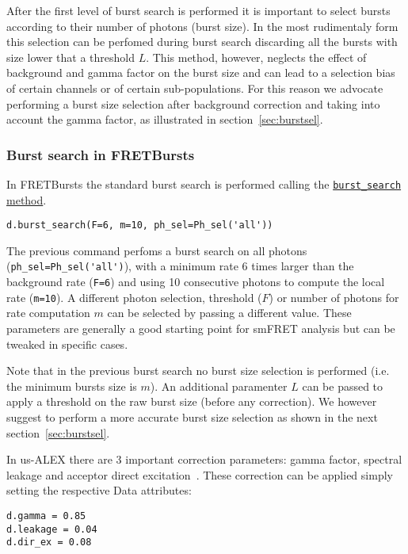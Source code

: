 After the first level of burst search is performed it is important to select bursts according to their number of photons (burst size). In the most rudimentaly form this selection can be perfomed during burst search discarding all the bursts
with size lower that a threshold $L$. This method, however, neglects the effect of background and gamma factor on the burst size and can lead to a selection bias of certain channels or of certain sub-populations. 
For this reason we advocate performing a burst size selection after background correction and taking into account the gamma factor, as illustrated in section~\ref{sec:burstsel}.

\subsubsection{Burst search in FRETBursts}
\label{sec:burstsearch_code}

In FRETBursts the standard burst search is performed calling the \href{http://fretbursts.readthedocs.org/en/latest/data_class.html#fretbursts.burstlib.Data.burst\_search}{\verb|burst_search| method}.

\begin{verbatim}
d.burst_search(F=6, m=10, ph_sel=Ph_sel('all'))
\end{verbatim}

The previous command perfoms a burst search on all photons (\verb|ph_sel=Ph_sel('all')|), with a minimum rate 6 times larger than the background rate (\verb|F=6|) and using 10 consecutive photons to compute the local rate (\verb|m=10|).
A different photon selection, threshold ($F$) or number of photons for rate computation $m$ can be selected by passing a different value. These parameters are generally a good starting point for smFRET analysis but can be tweaked in specific cases.

Note that in the previous burst search no burst size selection is performed (i.e. the minimum bursts size is $m$). 
An additional paramenter $L$ can be passed to apply a threshold on the raw burst size (before any correction). 
We however suggest to perform a more accurate burst size selection as shown in the next section~\ref{sec:burstsel}.

In us-ALEX there are 3 important correction parameters: gamma factor, spectral leakage and 
acceptor direct excitation~\cite{Lee_2005}. These correction can be applied simply setting the respective
Data attributes:

\begin{verbatim}
d.gamma = 0.85
d.leakage = 0.04
d.dir_ex = 0.08
\end{verbatim}

